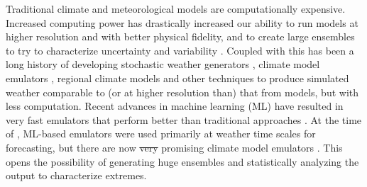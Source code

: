 \documentclass{ametsocV6.1}
\providecommand{\DIFdel}[1]{{\protect\color{red}\sout{#1}}}                      %
\providecommand{\DIFdelbegin}{} %
\providecommand{\DIFdelend}{} %
\newcommand{\DIFscaledelfig}{0.5}
\newlength{\DIFdelgraphicswidth} %
\newlength{\DIFdelgraphicsheight} %
\newcommand{\DIFdelincludegraphics}[2][]{%
\sbox{\DIFdelgraphicsbox}{\DIFOincludegraphics[#1]{#2}}%
\settoboxwidth{\DIFdelgraphicswidth}{\DIFdelgraphicsbox} %
\settoboxtotalheight{\DIFdelgraphicsheight}{\DIFdelgraphicsbox} %
\scalebox{\DIFscaledelfig}{%
\parbox[b]{\DIFdelgraphicswidth}{\usebox{\DIFdelgraphicsbox}\\[-\baselineskip] \rule{\DIFdelgraphicswidth}{0em}}\llap{\resizebox{\DIFdelgraphicswidth}{\DIFdelgraphicsheight}{%
\setlength{\unitlength}{\DIFdelgraphicswidth}%
\begin{picture}(1,1)%
\thicklines\linethickness{2pt} %
{\color[rgb]{1,0,0}\put(0,0){\framebox(1,1){}}}%
{\color[rgb]{1,0,0}\put(0,0){\line( 1,1){1}}}%
{\color[rgb]{1,0,0}\put(0,1){\line(1,-1){1}}}%
\end{picture}%
}\hspace*{3pt}}} %
} %
\DeclareRobustCommand{\DIFdelbegin}{\DIFOdelbegin \let\includegraphics\DIFdelincludegraphics} %
\DeclareRobustCommand{\DIFdelend}{\DIFOaddend \let\includegraphics\DIFOincludegraphics} %
\begin{document}
Traditional climate and meteorological models are computationally expensive. Increased computing power has drastically increased our ability to run models at higher resolution and with better physical fidelity, and to create large ensembles to try to characterize uncertainty and variability \citep{FlatoEtAl2013,nasem2024pmp}. Coupled with this has been a long history of developing stochastic weather generators \citep{ailliot2015stochastic}, climate model emulators \citep{tebaldi2025emulators}, regional climate models \citep{giorgi2019thirty} and other techniques to produce simulated weather comparable to (or at higher resolution than) that from models, but with less computation. Recent advances in machine learning (ML) have resulted in very fast emulators that perform better than traditional approaches \citep{bi2023accurate,lam2023learning,price2025probabilistic}. At the time of \citet{nasem2024pmp}, ML-based emulators were used primarily at weather time scales for forecasting, but there are now \DIFdelbegin \DIFdel{very }\DIFdelend promising climate model emulators \citep{chapman2025camulator,cresswell2024deep,watt2025ace2}. This opens the possibility of generating huge ensembles and statistically analyzing the output to characterize extremes. 


\end{document}
